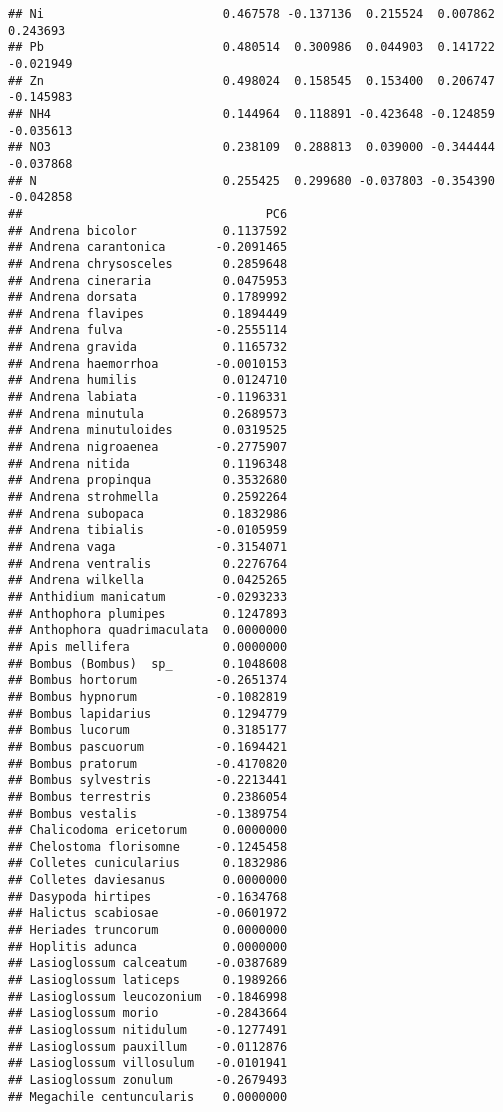 \documentclass[
]{article}
\begin{document}
\begin{verbatim}
## Ni                         0.467578 -0.137136  0.215524  0.007862  0.243693
## Pb                         0.480514  0.300986  0.044903  0.141722 -0.021949
## Zn                         0.498024  0.158545  0.153400  0.206747 -0.145983
## NH4                        0.144964  0.118891 -0.423648 -0.124859 -0.035613
## NO3                        0.238109  0.288813  0.039000 -0.344444 -0.037868
## N                          0.255425  0.299680 -0.037803 -0.354390 -0.042858
##                                  PC6
## Andrena bicolor            0.1137592
## Andrena carantonica       -0.2091465
## Andrena chrysosceles       0.2859648
## Andrena cineraria          0.0475953
## Andrena dorsata            0.1789992
## Andrena flavipes           0.1894449
## Andrena fulva             -0.2555114
## Andrena gravida            0.1165732
## Andrena haemorrhoa        -0.0010153
## Andrena humilis            0.0124710
## Andrena labiata           -0.1196331
## Andrena minutula           0.2689573
## Andrena minutuloides       0.0319525
## Andrena nigroaenea        -0.2775907
## Andrena nitida             0.1196348
## Andrena propinqua          0.3532680
## Andrena strohmella         0.2592264
## Andrena subopaca           0.1832986
## Andrena tibialis          -0.0105959
## Andrena vaga              -0.3154071
## Andrena ventralis          0.2276764
## Andrena wilkella           0.0425265
## Anthidium manicatum       -0.0293233
## Anthophora plumipes        0.1247893
## Anthophora quadrimaculata  0.0000000
## Apis mellifera             0.0000000
## Bombus (Bombus)  sp_       0.1048608
## Bombus hortorum           -0.2651374
## Bombus hypnorum           -0.1082819
## Bombus lapidarius          0.1294779
## Bombus lucorum             0.3185177
## Bombus pascuorum          -0.1694421
## Bombus pratorum           -0.4170820
## Bombus sylvestris         -0.2213441
## Bombus terrestris          0.2386054
## Bombus vestalis           -0.1389754
## Chalicodoma ericetorum     0.0000000
## Chelostoma florisomne     -0.1245458
## Colletes cunicularius      0.1832986
## Colletes daviesanus        0.0000000
## Dasypoda hirtipes         -0.1634768
## Halictus scabiosae        -0.0601972
## Heriades truncorum         0.0000000
## Hoplitis adunca            0.0000000
## Lasioglossum calceatum    -0.0387689
## Lasioglossum laticeps      0.1989266
## Lasioglossum leucozonium  -0.1846998
## Lasioglossum morio        -0.2843664
## Lasioglossum nitidulum    -0.1277491
## Lasioglossum pauxillum    -0.0112876
## Lasioglossum villosulum   -0.0101941
## Lasioglossum zonulum      -0.2679493
## Megachile centuncularis    0.0000000

\end{verbatim}
\end{document}
